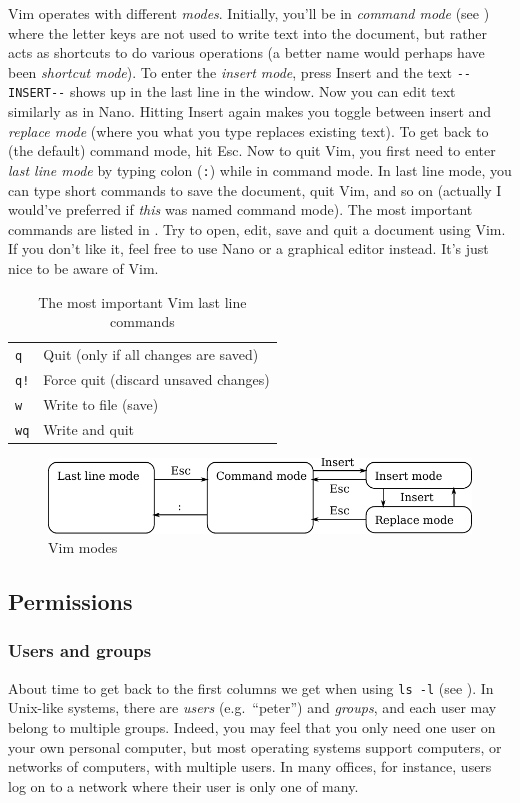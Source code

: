 Vim operates with different \emph{modes}. Initially, you'll be in \emph{command mode} (see ) where the letter keys are not used to write text into the document, but rather acts as shortcuts to do various operations (a better name would perhaps have been \emph{shortcut mode}). To enter the \emph{insert mode}, press Insert and the text \verb|--INSERT--| shows up in the last line in the window. Now you can edit text similarly as in Nano. Hitting Insert again makes you toggle between insert and \emph{replace mode} (where you what you type replaces existing text). To get back to (the default) command mode, hit Esc. Now to quit Vim, you first need to enter \emph{last line mode} by typing colon (\verb|:|) while in command mode. In last line mode, you can type short commands to save the document, quit Vim, and so on (actually I would've preferred if \emph{this} was named command mode). The most important commands are listed in . Try to open, edit, save and quit a document using Vim. If you don't like it, feel free to use Nano or a graphical editor instead. It's just nice to be aware of Vim.

\begin{table}
	\centering
	\caption{The most important Vim last line commands}
	\begin{tabular}{ll}
	\hline
	\verb|q|			&	Quit (only if all changes are saved)	\\
	\verb|q!|		&	Force quit (discard unsaved changes)	\\
	\verb|w|			&	Write to file (save)					\\
	\verb|wq|		&	Write and quit
	\end{tabular}
	\label{tab:bash:vi}
\end{table}

\begin{figure}
	\centering
	\includegraphics[scale=0.8]{graphics/vi.pdf}
	\caption{Vim modes}
	\label{fig:bash:vi}
\end{figure}

\subsection{Permissions}\label{sec:bash:permissions}
\subsubsection{Users and groups}
About time to get back to the first columns we get when using \verb|ls -l| (see ). In Unix-like systems, there are \emph{users} (e.g.\ ``peter'') and \emph{groups}, and each user may belong to multiple groups. Indeed, you may feel that you only need one user on your own personal computer, but most operating systems support computers, or networks of computers, with multiple users. In many offices, for instance, users log on to a network where their user is only one of many.

